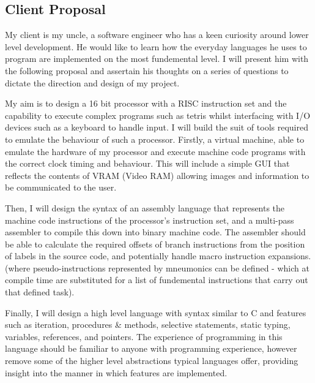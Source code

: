 \subsection{Client Proposal}
My client is my uncle, a software engineer who has a keen curiosity around lower level development. He would like to learn how the everyday languages he uses to program are implemented on the most fundemental level. I will present him with the following proposal and assertain his thoughts on a series of questions to dictate the direction and design of my project.

My aim is to design a 16 bit processor with a RISC instruction set and the capability to execute complex programs such as tetris whilst interfacing with I/O devices such as a keyboard to handle input. I will build the suit of tools required to emulate the behaviour of such a processor. Firstly, a virtual machine, able to emulate the hardware of my processor and execute machine code programs with the correct clock timing and behaviour. This will include a simple GUI that reflects the contents of VRAM (Video RAM) allowing images and information to be communicated to the user.

Then, I will design the syntax of an assembly language that represents the machine code instructions of the processor's instruction set, and a multi-pass assembler to compile this down into binary machine code. The assembler should be able to calculate the required offsets of branch instructions from the position of labels in the source code, and potentially handle macro instruction expansions. (where pseudo-instructions represented by mneumonics can be defined - which at compile time are substituted for a list of fundemental instructions that carry out that defined task).

Finally, I will design a high level language with syntax similar to C and features such as iteration, procedures \& methods, selective statements, static typing, variables, references, and pointers. The experience of programming in this language should be familiar to anyone with programming experience, however remove some of the higher level abstractions typical languages offer, providing insight into the manner in which features are implemented. 



\newpage

\newpage



\newpage
